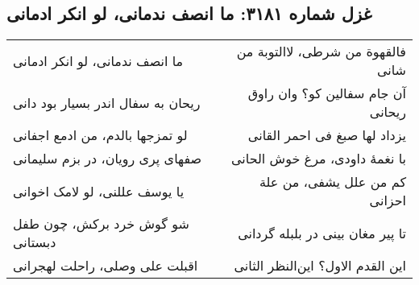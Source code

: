 \begin{center}
\section*{غزل شماره ۳۱۸۱: ما انصف ندمانی، لو انکر ادمانی}
\label{sec:3181}
\begin{longtable}{l p{0.5cm} r}
ما انصف ندمانی، لو انکر ادمانی
&&
فالقهوة من شرطی، لاالتوبة من شانی
\\
ریحان به سفال اندر بسیار بود دانی
&&
آن جام سفالین کو؟ وان راوق ریحانی
\\
لو تمزجها بالدم، من ادمع اجفانی
&&
یزداد لها صبغ فی احمر القانی
\\
صفهای پری رویان، در بزم سلیمانی
&&
با نغمهٔ داودی، مرغ خوش الحانی
\\
یا یوسف عللنی، لو لامک اخوانی
&&
کم من علل یشفی، من علة احزانی
\\
شو گوش خرد برکش، چون طفل دبستانی
&&
تا پیر مغان بینی در بلبله گردانی
\\
اقبلت علی وصلی، راحلت لهجرانی
&&
این القدم الاول؟ این‌النظر الثانی
\\
\end{longtable}
\end{center}
